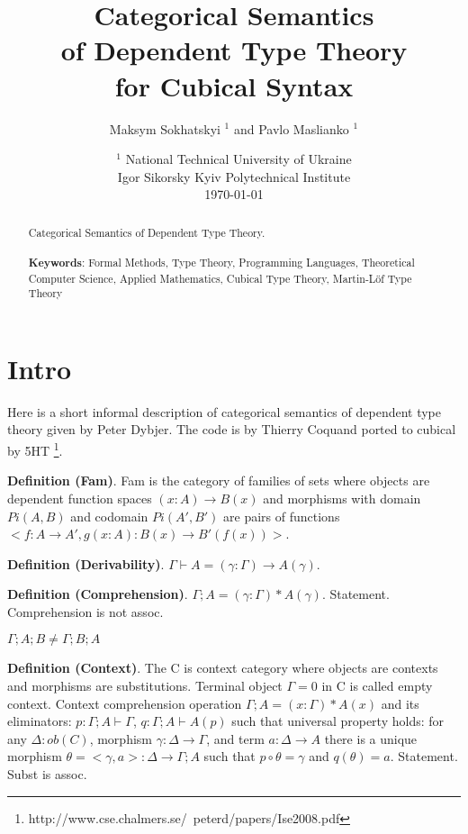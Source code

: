\documentclass{article}
\begin{document}
\title{Categorical Semantics \\ of Dependent Type Theory\\ for Cubical Syntax}
\author{Maksym Sokhatskyi $^1$ and Pavlo Maslianko $^1$}
\date{
    $^1$ National Technical University of Ukraine \\
    \small Igor Sikorsky Kyiv Polytechnical Institute\\
    \today
}

\maketitle

\begin{abstract}

Categorical Semantics of Dependent Type Theory.
\\
\\
{\bf Keywords}: Formal Methods, Type Theory, Programming Languages,
          Theoretical Computer Science, Applied Mathematics,
          Cubical Type Theory, Martin-Löf Type Theory
\end{abstract}

\newpage
\tableofcontents

\newpage
\section{Intro}

Here is a short informal description of
categorical semantics of dependent type theory given by Peter Dybjer.
The code is by Thierry Coquand ported to cubical by 5HT \footnote{http://www.cse.chalmers.se/~peterd/papers/Ise2008.pdf}.

{\bf Definition (Fam)}. Fam is the category of families
of sets where objects are dependent function
spaces $(x:A)\rightarrow B(x)$ and morphisms with domain
$Pi(A,B)$ and codomain $Pi(A',B')$ are pairs of
functions $<f:A\rightarrow A',g(x:A):B(x)\rightarrow B'(f(x))>$.

{\bf Definition (Derivability)}.  $\Gamma\vdash A = (\gamma:\Gamma)\rightarrow A(\gamma)$.

{\bf Definition (Comprehension)}. $\Gamma;A = (\gamma:\Gamma)*A(\gamma)$.
Statement. Comprehension is not assoc.

                  $\Gamma;A;B \neq \Gamma;B;A$

{\bf Definition (Context)}. The C is context category where
objects are contexts and morphisms are substitutions.
Terminal object $\Gamma=0$ in C is called empty context.
Context comprehension operation $\Gamma;A = (x:\Gamma)*A(x)$ and
its eliminators: $p:\Gamma;A\vdash\Gamma$, $q:\Gamma;A\vdash A(p)$ such that
universal property holds: for any $\Delta:ob(C)$, morphism $\gamma:\Delta\rightarrow\Gamma$,
and term $a:\Delta\rightarrow A$ there is a unique morphism $\theta=<\gamma,a>:\Delta\rightarrow\Gamma;A$
such that $p\circ\theta=\gamma$ and $q(\theta)=a$. Statement. Subst is assoc.
\end{document}
